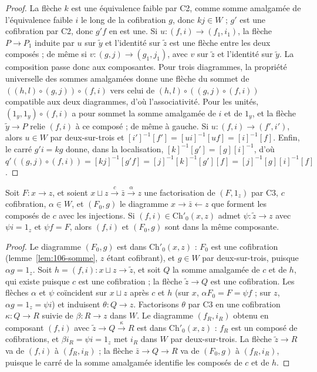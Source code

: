 \begin{proof}
La flèche $k$ est une équivalence faible par C2, comme somme amalgamée de l'équivalence faible $i$ le long de la cofibration $g$, donc $kj \in W$ ; $g'$ est une cofibration par C2, donc $g' f$ en est une. Si $u : (f, i) \to (f_1, i_1)$, la flèche $P \to P_1$ induite par $u$ sur $\widetilde y$ et l'identité sur $\widetilde z$ est une flèche entre les deux composés ; de même si $v : (g, j) \to (g_1, j_1)$, avec $v$ sur $\widetilde z$ et l'identité sur $\widetilde y$. La composition passe donc aux composantes. Pour trois diagrammes, la propriété universelle des sommes amalgamées donne une flèche du sommet de $((h, l) \circ (g, j)) \circ (f, i)$ vers celui de $(h, l) \circ ((g, j) \circ (f, i))$ compatible aux deux diagrammes, d'où l'associativité. Pour les unités, $(1_y, 1_y) \circ (f, i)$ a pour sommet la somme amalgamée de $i$ et de $1_y$, et la flèche $\widetilde y \to P$ relie $(f, i)$ à ce composé ; de même à gauche. Si $u : (f, i) \to (f', i')$, alors $u \in W$ par deux-sur-trois et $[i']^{-1}[f'] = [ui]^{-1}[uf] = [i]^{-1}[f]$. Enfin, le carré $g' i = k g$ donne, dans la localisation, $[k]^{-1}[g'] = [g][i]^{-1}$, d'où $q'((g, j) \circ (f, i)) = [kj]^{-1}[g' f] = [j]^{-1}[k]^{-1}[g'][f] = [j]^{-1}[g][i]^{-1}[f]$.
\end{proof}

\begin{lemme}\label{lem:106-composante}
Soit $F : x \to z$, et soient $x \sqcup z \xrightarrow{c} \bar z \xrightarrow{\alpha} z$ une factorisation de $(F, 1_z)$ par C3, $c$ cofibration, $\alpha \in W$, et $(F_0, g)$ le diagramme $x \to \bar z \leftarrow z$ que forment les composés de $c$ avec les injections. Si $(f, i) \in \mathrm{Ch}'_0(x, z)$ admet $\psi : \widetilde z \to z$ avec $\psi i = 1_z$ et $\psi f = F$, alors $(f, i)$ et $(F_0, g)$ sont dans la même composante.
\end{lemme}

\begin{proof}
Le diagramme $(F_0, g)$ est dans $\mathrm{Ch}'_0(x, z)$ : $F_0$ est une cofibration (lemme~\ref{lem:106-somme}, $z$ étant cofibrant), et $g \in W$ par deux-sur-trois, puisque $\alpha g = 1_z$. Soit $h = (f, i) : x \sqcup z \to \widetilde z$, et soit $Q$ la somme amalgamée de $c$ et de $h$, qui existe puisque $c$ est une cofibration ; la flèche $\widetilde z \to Q$ est une cofibration. Les flèches $\alpha$ et $\psi$ coïncident sur $x \sqcup z$ après $c$ et $h$ (sur $x$, $\alpha F_0 = F = \psi f$ ; sur $z$, $\alpha g = 1_z = \psi i$) et induisent $\theta : Q \to z$. Factorisons $\theta$ par C3 en une cofibration $\kappa : Q \to R$ suivie de $\beta : R \to z$ dans $W$. Le diagramme $(f_R, i_R)$ obtenu en composant $(f, i)$ avec $\widetilde z \to Q \xrightarrow{\kappa} R$ est dans $\mathrm{Ch}'_0(x, z)$ : $f_R$ est un composé de cofibrations, et $\beta i_R = \psi i = 1_z$ met $i_R$ dans $W$ par deux-sur-trois. La flèche $\widetilde z \to R$ va de $(f, i)$ à $(f_R, i_R)$ ; la flèche $\bar z \to Q \to R$ va de $(F_0, g)$ à $(f_R, i_R)$, puisque le carré de la somme amalgamée identifie les composés de $c$ et de $h$.
\end{proof}

